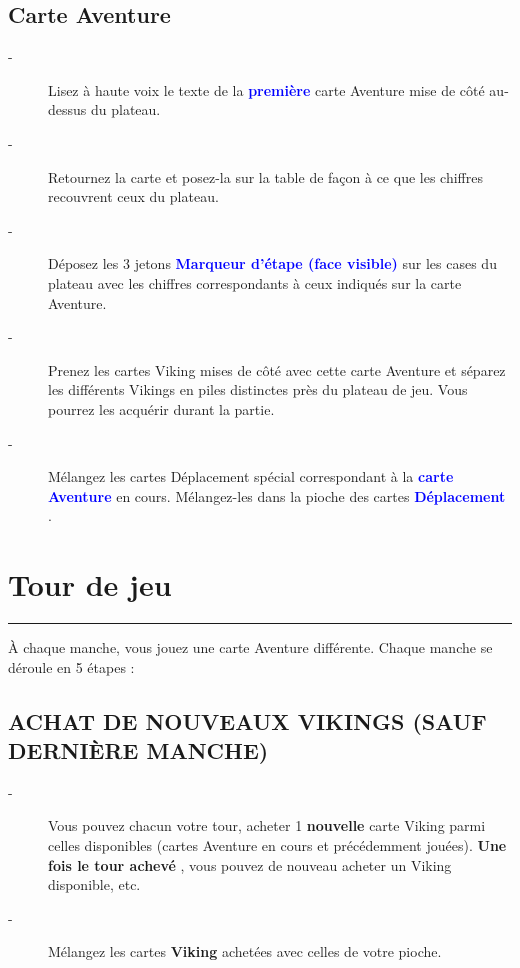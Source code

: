 \documentclass{scrartcl}%
\begin{document}
\subsection{ Carte Aventure
}%
\label{subsec:CarteAventure}%
\begin{description}%
\item[{-} ]%
%
 Lisez à haute voix le texte de la %
\textcolor{blue}{%
\textbf{première}%
}%
\textit{ }%
 carte Aventure mise de côté au{-}dessus du plateau.
%
\item[{-} ]%
%
 Retournez la carte et posez{-}la sur la table de façon à ce que les chiffres recouvrent ceux du plateau.
%
\item[{-} ]%
%
 Déposez les 3 jetons %
\textcolor{blue}{%
\textbf{Marqueur d'étape (face visible)}%
}%
\textit{ }%
 sur les cases du plateau avec les chiffres correspondants à ceux indiqués sur la carte Aventure.
%
\item[{-} ]%
%
 Prenez les cartes Viking mises de côté avec cette carte Aventure et séparez les différents Vikings en piles distinctes près du plateau de jeu. Vous pourrez les acquérir durant la partie.
%
\item[{-} ]%
%
 Mélangez les cartes Déplacement spécial correspondant à la %
\textcolor{blue}{%
\textbf{carte Aventure}%
}%
\textit{ }%
 en cours. Mélangez{-}les dans la pioche des cartes %
\textcolor{blue}{%
\textbf{Déplacement}%
}%
. 
%
\end{description}

%
\sectionfont{\color{mygreen}}%
\subsectionfont{\color{mygreen}}%
\subsubsectionfont{\color{mygreen}}%
\section{ Tour de jeu
}%
\label{sec:Tourdejeu}%
\textcolor{mygreen}{\rule{18cm}{0.07cm}}\break%
À chaque manche, vous jouez une carte Aventure différente. Chaque manche se déroule en 5 étapes :


%
\subsection{ ACHAT DE NOUVEAUX VIKINGS (SAUF DERNIÈRE MANCHE)
}%
\label{subsec:ACHATDENOUVEAUXVIKINGS(SAUFDERNIREMANCHE)}%
\begin{description}%
\item[{-} ]%
%
 Vous pouvez chacun votre tour, acheter 1%
\textcolor{mygreen}{%
\textbf{ nouvelle}%
}%
\textit{ }%
 carte Viking parmi celles disponibles (cartes Aventure en cours et précédemment jouées).%
\textcolor{mygreen}{%
\textbf{ Une fois le tour achevé}%
}%
, vous pouvez de nouveau acheter un Viking disponible, etc.
%
\item[{-} ]%
%
 Mélangez les cartes %
\textcolor{mygreen}{%
\textbf{Viking}%
}%
\textit{ }%
 achetées avec celles de votre pioche.
%
\end{description}
\end{document}

